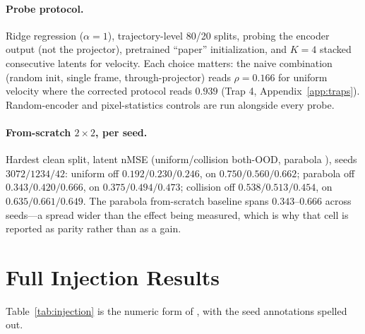 \paragraph{Probe protocol.}
Ridge regression ($\alpha{=}1$), trajectory-level 80/20 splits, probing the encoder output (not the projector), pretrained ``paper'' initialization, and $K{=}4$ stacked consecutive latents for velocity. Each choice matters: the naive combination (random init, single frame, through-projector) reads $\rho{=}0.166$ for uniform velocity where the corrected protocol reads $0.939$ (Trap 4, Appendix~\ref{app:traps}). Random-encoder and pixel-statistics controls are run alongside every probe.

\paragraph{From-scratch $2{\times}2$, per seed.}
Hardest clean split, latent nMSE (uniform/collision both-OOD, parabola \rmood), seeds $3072/1234/42$:
uniform off $0.192/0.230/0.246$, on $0.750/0.560/0.662$;
parabola off $0.343/0.420/0.666$, on $0.375/0.494/0.473$;
collision off $0.538/0.513/0.454$, on $0.635/0.661/0.649$.
The parabola from-scratch baseline spans $0.343$--$0.666$ across seeds---a spread wider than the effect being measured, which is why that cell is reported as parity rather than as a gain.

\section{Full Injection Results}
\label{app:injection}

Table~\ref{tab:injection} is the numeric form of , with the seed annotations spelled out.

